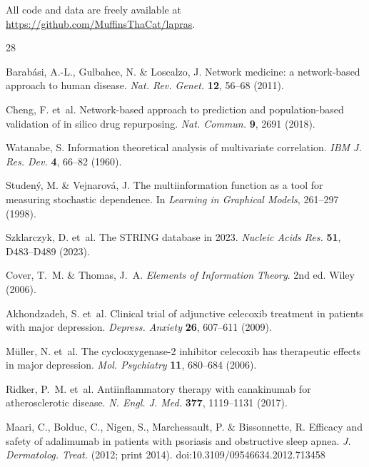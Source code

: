 \documentclass[11pt,a4paper]{article}
\begin{document}
All code and data are freely available at \url{https://github.com/MuffinsThaCat/lapras}.


\begin{thebibliography}{28}

Barab{\'a}si, A.-L., Gulbahce, N. \& Loscalzo, J.
\newblock Network medicine: a network-based approach to human disease.
\newblock \emph{Nat. Rev. Genet.} \textbf{12}, 56--68 (2011).

Cheng, F. et~al.
\newblock Network-based approach to prediction and population-based validation of in silico drug repurposing.
\newblock \emph{Nat. Commun.} \textbf{9}, 2691 (2018).

Watanabe, S.
\newblock Information theoretical analysis of multivariate correlation.
\newblock \emph{IBM J. Res. Dev.} \textbf{4}, 66--82 (1960).

Studen{\'y}, M. \& Vejnarov{\'a}, J.
\newblock The multiinformation function as a tool for measuring stochastic dependence.
\newblock In \emph{Learning in Graphical Models}, 261--297 (1998).

Szklarczyk, D. et~al.
\newblock The STRING database in 2023.
\newblock \emph{Nucleic Acids Res.} \textbf{51}, D483--D489 (2023).

Cover, T.~M. \& Thomas, J.~A.
\newblock \emph{Elements of Information Theory}.
\newblock 2nd ed. Wiley (2006).

Akhondzadeh, S. et~al.
\newblock Clinical trial of adjunctive celecoxib treatment in patients with major depression.
\newblock \emph{Depress. Anxiety} \textbf{26}, 607--611 (2009).

M{\"u}ller, N. et~al.
\newblock The cyclooxygenase-2 inhibitor celecoxib has therapeutic effects in major depression.
\newblock \emph{Mol. Psychiatry} \textbf{11}, 680--684 (2006).

Ridker, P.~M. et~al.
\newblock Antiinflammatory therapy with canakinumab for atherosclerotic disease.
\newblock \emph{N. Engl. J. Med.} \textbf{377}, 1119--1131 (2017).

Maari, C., Bolduc, C., Nigen, S., Marchessault, P. \& Bissonnette, R.
\newblock Efficacy and safety of adalimumab in patients with psoriasis and obstructive sleep apnea.
\newblock \emph{J. Dermatolog. Treat.} (2012; print 2014). doi:10.3109/09546634.2012.713458


\end{thebibliography}
\end{document}
